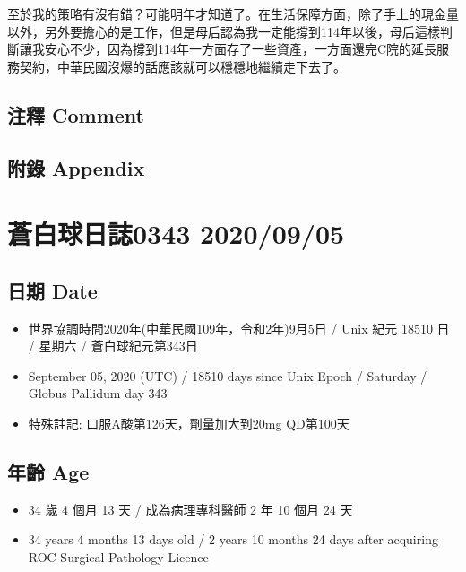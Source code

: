 \documentclass[
]{article}
\providecommand{\tightlist}{%
  \setlength{\itemsep}{0pt}\setlength{\parskip}{0pt}}
\begin{document}
至於我的策略有沒有錯？可能明年才知道了。在生活保障方面，除了手上的現金量以外，另外要擔心的是工作，但是母后認為我一定能撐到114年以後，母后這樣判斷讓我安心不少，因為撐到114年一方面存了一些資產，一方面還完C院的延長服務契約，中華民國沒爆的話應該就可以穩穩地繼續走下去了。

\hypertarget{ux6ce8ux91cb-comment-3}{%
\subsection{注釋 Comment}\label{ux6ce8ux91cb-comment-3}}

\hypertarget{ux9644ux9304-appendix-3}{%
\subsection{附錄 Appendix}\label{ux9644ux9304-appendix-3}}

\hypertarget{ux84bcux767dux7403ux65e5ux8a8c0343-20200905}{%
\section{蒼白球日誌0343
2020/09/05}\label{ux84bcux767dux7403ux65e5ux8a8c0343-20200905}}

\hypertarget{ux65e5ux671f-date-4}{%
\subsection{日期 Date}\label{ux65e5ux671f-date-4}}

\begin{itemize}
\tightlist
\item
  世界協調時間2020年(中華民國109年，令和2年)9月5日 / Unix 紀元 18510 日
  / 星期六 / 蒼白球紀元第343日
\item
  September 05, 2020 (UTC) / 18510 days since Unix Epoch / Saturday /
  Globus Pallidum day 343
\item
  特殊註記: 口服A酸第126天，劑量加大到20mg QD第100天
\end{itemize}

\hypertarget{ux5e74ux9f61-age-4}{%
\subsection{年齡 Age}\label{ux5e74ux9f61-age-4}}

\begin{itemize}
\tightlist
\item
  34 歲 4 個月 13 天 / 成為病理專科醫師 2 年 10 個月 24 天
\item
  34 years 4 months 13 days old / 2 years 10 months 24 days after
  acquiring ROC Surgical Pathology Licence
\end{itemize}
\end{document}

